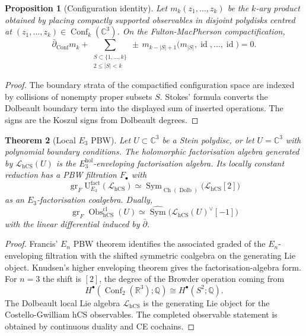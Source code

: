 \documentclass[11pt]{amsart}
\providecommand{\C}{\mathbb{C}}
\providecommand{\R}{\mathbb{R}}
\providecommand{\Q}{\mathbb{Q}}
\providecommand{\dbar}{\bar{\partial}}
\providecommand{\Sym}{\operatorname{Sym}}
\providecommand{\Obs}{\operatorname{Obs}}
\providecommand{\hCS}{\operatorname{hCS}}
\providecommand{\Ch}{\operatorname{Ch}}
\providecommand{\Dolb}{\operatorname{Dolb}}
\providecommand{\cL}{\mathcal{L}}
\providecommand{\Ethree}{E_3}
\theoremstyle{plain}
\newtheorem{theorem}{Theorem}[section]
\newtheorem{proposition}[theorem]{Proposition}
\theoremstyle{definition}
\theoremstyle{remark}
\begin{document}
\begin{proposition}[Configuration identity]
\label{prop:configuration-identity}
Let \(m_k(z_1,\ldots,z_k)\) be the \(k\)-ary product obtained by placing
compactly supported observables in disjoint polydisks centred at
\((z_1,\ldots,z_k)\in\operatorname{Conf}_k(\C^3)\). On the
Fulton-MacPherson compactification,
\[
  \dbar_{\operatorname{Conf}}m_k
  +
  \sum_{\substack{S\subset\{1,\ldots,k\}\\2\leq |S|<k}}
  \pm\,
  m_{k-|S|+1}
  \bigl(m_{|S|},\operatorname{id},\ldots,\operatorname{id}\bigr)
  =0 .
\]
\end{proposition}

\begin{proof}
The boundary strata of the compactified configuration space are indexed
by collisions of nonempty proper subsets \(S\). Stokes' formula converts
the Dolbeault boundary term into the displayed sum of inserted
operations. The signs are the Koszul signs from Dolbeault degrees.
\end{proof}

\begin{theorem}[Local \(E_3\) PBW]
\label{thm:e3-pbw}
Let \(U\subset\C^3\) be a Stein polydisc, or let \(U=\C^3\) with
polynomial boundary conditions. The holomorphic factorisation algebra
generated by \(\cL_{\hCS}(U)\) is the
\(\Ethree^{\mathrm{hol}}\)-enveloping factorisation algebra. Its
locally constant reduction has a PBW filtration \(F_\bullet\) with
\[
  \operatorname{gr}_F
  \mathrm U^{\mathrm{fact}}_{\Ethree}(\cL_{\hCS})
  \simeq
  \Sym_{\Ch(\Dolb)}\bigl(\cL_{\hCS}[2]\bigr)
\]
as an \(\Ethree\)-factorisation coalgebra. Dually,
\[
  \operatorname{gr}_F\Obs^{\mathrm{cl}}_{\hCS}(U)
  \simeq
  \widehat{\Sym}\bigl(\cL_{\hCS}(U)^\vee[-1]\bigr)
\]
with the linear differential induced by \(\dbar\).
\end{theorem}

\begin{proof}
Francis' \(E_n\) PBW theorem identifies the associated graded of the
\(E_n\)-enveloping filtration with the shifted symmetric coalgebra on
the generating Lie object. Knudsen's higher enveloping theorem gives
the factorisation-algebra form. For \(n=3\) the shift is \([2]\), the
degree of the Browder operation coming from
\[
  H^\bullet(\operatorname{Conf}_2(\R^3);\Q)
  \cong H^\bullet(S^2;\Q).
\]
The Dolbeault local Lie algebra \(\cL_{\hCS}\) is the generating Lie
object for the Costello-Gwilliam hCS observables. The completed
observable statement is obtained by continuous duality and CE cochains.
\end{proof}
\end{document}
